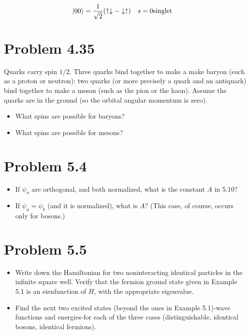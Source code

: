 \documentclass[../main.tex]{subfiles}
\begin{document}
\begin{align*}
    \ket{00} &= \frac{1}{\sqrt{2}}\qty(\uparrow\downarrow-\downarrow\uparrow) \quad s=0\mathrm{singlet}
\end{align*}


\section{Problem 4.35}

Quarks carry spin $1/2$.
Three quarks bind together to make a make baryon (such as a proton or neutron): two quarks (or more precisely a quark and an antiquark) bind together to make a meson (such as the pion or the kaon).
Assume the quarks are in the ground (so the orbital angular momentum is zero).

\begin{itemize}
    \item What spins are possible for baryons?
    \item What spins are possible for mesons?
\end{itemize}

\section{Problem 5.4}

\begin{itemize}
    \item If $\psi_a$ are orthogonal, and both normalized, what is the constant $A$ in 5.10?
    \item If $\psi_a=\psi_b$ (and it is normalized), what is $A$? (This case, of course, occurs only for bosons.)
\end{itemize}

\section{Problem 5.5}

\begin{itemize}
    \item Write down the Hamiltonian for two noninteracting identical particles in the infinite square well.
        Verify that the fermion ground state given in Example 5.1 is an eienfunction of $H$, with the appropriate eigenvalue.
    \item Find the next two excited states (beyond the ones in Example 5.1)-wave functions and energies-for each of the three cases (distinguishable, identical bosons, identical fermions).
\end{itemize}
\end{document}
